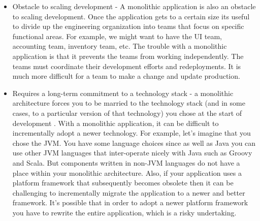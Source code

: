 \begin{itemize}
    \item Obstacle to scaling development - A monolithic application is also an obstacle to scaling development. Once the application gets to a certain size its useful to divide up the engineering organization into teams that focus on specific functional areas. For example, we might want to have the UI team, accounting team, inventory team, etc. The trouble with a monolithic application is that it prevents the teams from working independently. The teams must coordinate their development efforts and redeployments. It is much more difficult for a team to make a change and update production.

    \item Requires a long-term commitment to a technology stack - a monolithic architecture forces you 
	to be married to the technology stack (and in some cases, to a particular version of that technology) 
	you chose at the start of development . With a monolithic application, 
	it can be difficult to incrementally adopt a newer technology. For example, let's imagine that you chose the JVM. You have some language choices since as well as Java you can use other JVM languages that inter-operate nicely with Java such as Groovy and Scala. But components written in non-JVM languages do not have a place within your monolithic architecture. Also, if your application uses a platform framework that subsequently becomes obsolete then it can be challenging to incrementally migrate the application to a newer and better framework. It's possible that in order to adopt a newer platform framework you have to rewrite the entire application, which is a risky undertaking.
\end{itemize}

